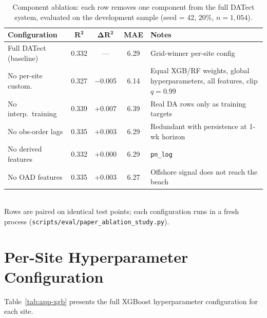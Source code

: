 \documentclass[toxins,article,submit,moreauthors]{Definitions/mdpi}
\begin{document}
\begin{table}[H]
\caption{Component ablation: each row removes one component from the full DATect system, evaluated on the development sample (seed = 42, 20\%, $n = 1{,}054$).}
\label{tab:ablation}
\centering\footnotesize
\begin{tabularx}{\linewidth}{lcccX}
\toprule
\textbf{Configuration} & $\boldsymbol{R^2}$ & $\boldsymbol{\Delta R^2}$ & \textbf{MAE} & \textbf{Notes} \\
\midrule
Full DATect (baseline)    & 0.332 & ---      & 6.29 & Grid-winner per-site config \\
No per-site custom.       & 0.327 & $-$0.005 & 6.14 & Equal XGB/RF weights, global hyperparameters, all features, clip $q = 0.99$ \\
No interp.\ training      & 0.339 & +0.007 & 6.39 & Real DA rows only as training targets \\
No obs-order lags         & 0.335 & +0.003 & 6.29 & Redundant with persistence at 1-wk horizon \\
No derived features       & 0.332 & +0.000 & 6.29 & \texttt{pn\_log} \\
No OAD features           & 0.335 & +0.003 & 6.27 & Offshore signal does not reach the beach \\
\bottomrule
\end{tabularx}
\vspace{0.3em}\\
\footnotesize{Rows are paired on identical test points; each configuration runs in a fresh process (\texttt{scripts/eval/paper\_ablation\_study.py}).}
\end{table}

\section{Per-Site Hyperparameter Configuration}
\label{app:hyperparams}

Table~\ref{tab:app-xgb} presents the full XGBoost hyperparameter configuration for each site.
\end{document}
